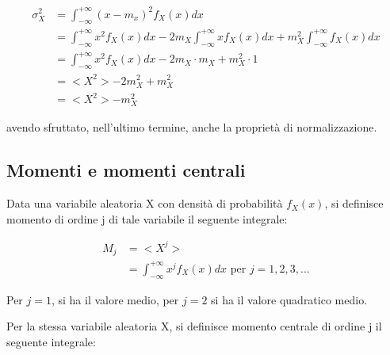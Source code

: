 {
    \Large 
    \begin{equation}
        \begin{split}
            \sigma_X ^{2}
            &= 
            \int_{- \infty}^{ + \infty}
            (x - m_x)^{2} f_X (x) dx 
            \\ 
            &= 
            \int_{- \infty}^{ + \infty}
            x^{2} f_X (x) dx  
            - 2 m_X 
            \int_{- \infty}^{ + \infty}
            x f_X (x) dx
            + m_X ^{2} 
            \int_{- \infty}^{ + \infty}
            f_X (x) dx 
            \\ 
            &= 
            \int_{- \infty}^{ + \infty}
            x^{2} f_X (x) dx  
            - 2 m_X 
            \cdot m_X
            + m_X ^{2} 
            \cdot 1 
            \\ 
            &=
            <X^{2}> - 2 m_X ^{2} + m_X ^{2}
            \\ 
            &= 
            <X^{2}> -  m_X ^{2}
        \end{split}
    \end{equation}
} 

avendo sfruttato, nell'ultimo termine, anche la proprietà di normalizzazione. \newline 

\subsection{Momenti e momenti centrali}

Data una variabile aleatoria X con densità di probabilità $f_X (x)$, si definisce 
momento di ordine j di tale variabile il seguente integrale: 

{
    \Large 
    \begin{equation}
        \begin{split}
            M_j 
            &= 
            <X ^{j}> 
            \\
            &= 
            \int_{- \infty}^{+ \infty} 
            x^{j} f_X (x) dx 
            \text{ per }
            j = 1, 2, 3, ...
        \end{split}
    \end{equation}
}

Per $j=1$, si ha il valore medio, per $j=2$ si ha il valore quadratico medio. \newline 

Per la stessa variabile aleatoria X, si definisce momento centrale di ordine j il seguente integrale: 

